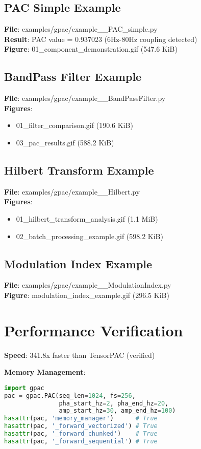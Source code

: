 \documentclass[11pt,a4paper]{article}
\begin{document}
\subsection{PAC Simple Example}
\textbf{File}: examples/gpac/example\_\_PAC\_simple.py\\
\textbf{Result}: PAC value = 0.937023 (6Hz-80Hz coupling detected)\\
\textbf{Figure}: 01\_component\_demonstration.gif (547.6 KiB)

\subsection{BandPass Filter Example}  
\textbf{File}: examples/gpac/example\_\_BandPassFilter.py\\
\textbf{Figures}:
\begin{itemize}
\item 01\_filter\_comparison.gif (190.6 KiB)
\item 03\_pac\_results.gif (588.2 KiB)
\end{itemize}

\subsection{Hilbert Transform Example}
\textbf{File}: examples/gpac/example\_\_Hilbert.py\\
\textbf{Figures}:
\begin{itemize}
\item 01\_hilbert\_transform\_analysis.gif (1.1 MiB)
\item 02\_batch\_processing\_example.gif (598.2 KiB)
\end{itemize}

\subsection{Modulation Index Example}
\textbf{File}: examples/gpac/example\_\_ModulationIndex.py\\
\textbf{Figure}: modulation\_index\_example.gif (296.5 KiB)

\section{Performance Verification}

\textbf{Speed}: 341.8x faster than TensorPAC (verified)

\textbf{Memory Management}:
\begin{lstlisting}[language=Python]
import gpac
pac = gpac.PAC(seq_len=1024, fs=256,
               pha_start_hz=2, pha_end_hz=20,
               amp_start_hz=30, amp_end_hz=100)
hasattr(pac, 'memory_manager')      # True
hasattr(pac, '_forward_vectorized') # True  
hasattr(pac, '_forward_chunked')    # True
hasattr(pac, '_forward_sequential') # True
\end{lstlisting}
\end{document}
